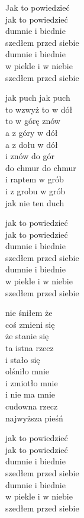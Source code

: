 \begin{text}
    \vin Jak to powiedzieć\\
    \vin jak to powiedzieć\\
    \vin dumnie i biednie\\
    \vin szedłem przed siebie\\
    \vin dumnie i biednie\\
    \vin w piekle i w niebie\\
    \vin szedłem przed siebie

    jak puch jak puch\\
    to wzwyż to w dół\\
    to w górę znów\\
    a z góry w dół\\
    a z dołu w dół\\
    i znów do gór\\
    do chmur do chmur\\
    i raptem w grób\\
    i z grobu w grób\\
    jak nie ten duch

    \vin jak to powiedzieć\\
    \vin jak to powiedzieć\\
    \vin dumnie i biednie\\
    \vin szedłem przed siebie\\
    \vin dumnie i biednie\\
    \vin w piekle i w niebie\\
    \vin szedłem przed siebie

    nie śniłem że\\
    coś zmieni się\\
    że stanie się\\
    ta istna rzecz\\
    i stało się\\
    olśniło mnie\\
    i zmiotło mnie\\
    i nie ma mnie\\
    cudowna rzecz\\
    najwyższa pieśń

    \vin jak to powiedzieć\\
    \vin jak to powiedzieć\\
    \vin dumnie i biednie\\
    \vin szedłem przed siebie\\
    \vin dumnie i biednie\\
    \vin w piekle i w niebie\\
    \vin szedłem przed siebie


\end{text}
